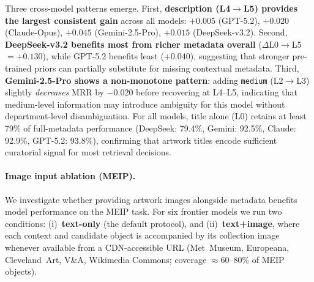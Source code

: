 \documentclass[11pt]{article}
\newcommand{\meip}{\textsc{MEIP}}
\begin{document}
\begin{table}[!t]
\centering\small
\setlength{\tabcolsep}{4pt}
\caption{Metadata ablation on MEIP ($n{=}200$, zero-shot). L0--L5 = progressively richer metadata; bold = best per model.}
\label{tab:ablation}
\end{table}

Three cross-model patterns emerge.
First, \textbf{description (L4$\to$L5) provides the largest consistent
gain} across all models: $+0.005$ (GPT-5.2), $+0.020$ (Claude-Opus),
$+0.045$ (Gemini-2.5-Pro), $+0.015$ (DeepSeek-v3.2).
Second, \textbf{DeepSeek-v3.2 benefits most from richer metadata overall}
($\Delta$L0$\to$L5 $= +0.130$), while GPT-5.2 benefits least ($+0.040$),
suggesting that stronger pre-trained priors can partially substitute for
missing contextual metadata.
Third, \textbf{Gemini-2.5-Pro shows a non-monotone pattern}: adding
\texttt{medium} (L2$\to$L3) slightly \emph{decreases} MRR by $-0.020$
before recovering at L4--L5, indicating that medium-level information
may introduce ambiguity for this model without department-level
disambiguation.
For all models, title alone (L0) retains at least 79\% of full-metadata
performance (DeepSeek: 79.4\%, Gemini: 92.5\%, Claude: 92.9\%, GPT-5.2:
93.8\%), confirming that artwork titles encode sufficient curatorial
signal for most retrieval decisions.

\paragraph{Image input ablation (\meip{}).}
We investigate whether providing artwork images alongside metadata
benefits model performance on the MEIP task.
For six frontier models we run two conditions:
(i)~\textbf{text-only} (the default protocol), and
(ii)~\textbf{text+image}, where each context and candidate object is
accompanied by its collection image whenever available from a
CDN-accessible URL (Met~Museum, Europeana, Cleveland~Art, V\&A,
Wikimedia Commons; coverage $\approx$60--80\% of MEIP objects).
\end{document}
